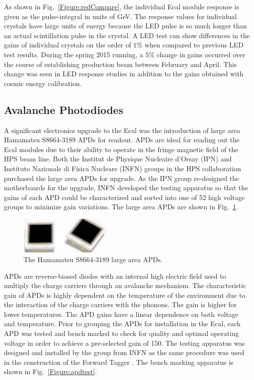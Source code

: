 \documentclass[12pt]{report}
\begin{document}
As shown in Fig.~\ref{Figure:redCompare}, the individual Ecal module response is given as the pulse-integral in units of GeV. The response values for individual crystals have large units of energy because the LED pulse is so much longer than an actual scintillation pulse in the crystal. A LED test can show differences in the gains of individual crystals on the order of $1\%$ when compared to previous LED test results. During the spring 2015 running, a 5$\%$ change in gains occurred over the course of establishing production beam between February and April. This change was seen in LED response studies in addition to the gains obtained with cosmic energy calibration.

\subsection{Avalanche Photodiodes}

A significant electronics upgrade to the Ecal was the introduction of large area Hamamatsu S8664-3189 APDs for readout. APDs are ideal for reading out the Ecal modules due to their ability to operate in the fringe magnetic field of the HPS beam line. Both the Institut de Physique Nucleaire d'Orsay (IPN) and Instituto Nazionale di Fisica Nucleare (INFN) groups in the HPS collaboration purchased the large area APDs for upgrade. As the IPN group re-designed the motherboards for the upgrade, INFN developed the testing apparatus so that the gains of each APD could be characterized and sorted into one of 52 high voltage groups to minimize gain variations. The large area APDs are shown in Fig.~\ref{Figure:apd}.

\begin{figure}[H]
  \centering
      \includegraphics[width=0.4\textwidth]{pics/experiment/apd.png}
  \caption[Hamamatsu S8664-3189 large area APDs]{The Hamamatsu S8664-3189 large area APDs.}
  \label{Figure:apd}
\end{figure}

APDs are reverse-biased diodes with an internal high electric field used to multiply the charge carriers through an avalanche mechanism.  The characteristic gain of APDs is highly dependent on the temperature of the environment due to the interaction of the charge carriers with the phonons. The gain is higher for lower temperatures. 
The APD gains have a linear dependence on both voltage and temperature. Prior to grouping the APDs for installation in the Ecal, each APD was tested and bench marked to check for quality and optimal operating voltage in order to achieve a pre-selected gain of 150. The testing apparatus was designed and installed by the group from INFN as the same procedure was used in the construction of the Forward Tagger \cite{Celentano}. The bench marking apparatus is shown in Fig.~\ref{Figure:apdtest}.
\end{document}
